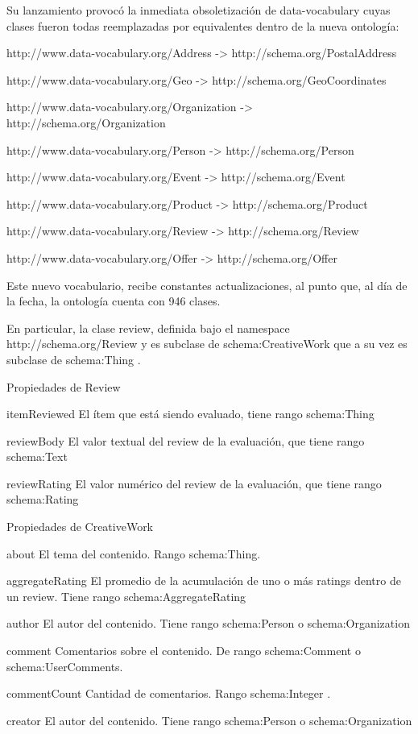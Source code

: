 Su lanzamiento provocó la inmediata obsoletización de data-vocabulary cuyas clases fueron todas reemplazadas por equivalentes 
dentro de la nueva ontología:

http://www.data-vocabulary.org/Address -> http://schema.org/PostalAddress

http://www.data-vocabulary.org/Geo -> http://schema.org/GeoCoordinates

http://www.data-vocabulary.org/Organization -> http://schema.org/Organization

http://www.data-vocabulary.org/Person -> http://schema.org/Person

http://www.data-vocabulary.org/Event -> http://schema.org/Event

http://www.data-vocabulary.org/Product -> http://schema.org/Product

http://www.data-vocabulary.org/Review -> http://schema.org/Review

http://www.data-vocabulary.org/Offer -> http://schema.org/Offer

Este nuevo vocabulario, recibe constantes actualizaciones, al punto que, al día de la fecha, la ontología cuenta con 946 clases. 

En particular, la clase review, definida bajo el namespace http://schema.org/Review y es subclase de schema:CreativeWork 
que a su vez es subclase de schema:Thing .

Propiedades de Review

itemReviewed	El ítem que está siendo evaluado, tiene rango schema:Thing 

reviewBody 	El valor textual del review de la evaluación, que tiene rango schema:Text 

reviewRating 	El valor numérico del review de la evaluación, que tiene rango schema:Rating 


Propiedades de CreativeWork 

about 	El tema del contenido. Rango schema:Thing. 

aggregateRating 	El promedio de la acumulación de uno o más ratings dentro de un review. Tiene rango schema:AggregateRating 

author 	El autor del contenido. Tiene rango schema:Person o schema:Organization

comment 	Comentarios sobre el contenido. De rango schema:Comment o schema:UserComments.

commentCount 	Cantidad de comentarios. Rango schema:Integer . 

creator 	El autor del contenido. Tiene rango schema:Person o schema:Organization

